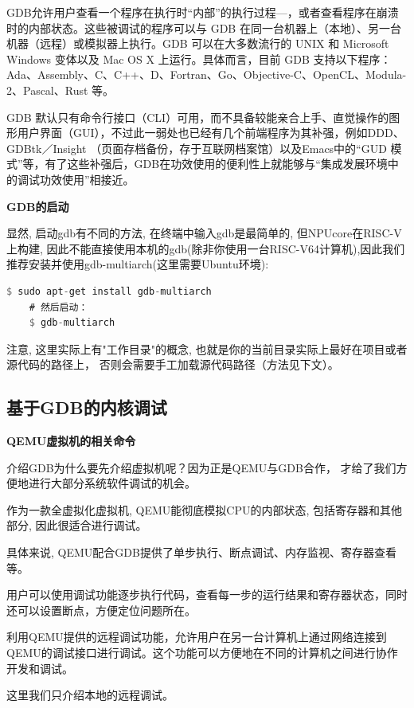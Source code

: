GDB允许用户查看一个程序在执行时“内部”的执行过程—，或者查看程序在崩溃时的内部状态。这些被调试的程序可以与 GDB 在同一台机器上（本地）、另一台机器（远程）或模拟器上执行。GDB 可以在大多数流行的 UNIX 和 Microsoft Windows 变体以及 Mac OS X 上运行。具体而言，目前 GDB 支持以下程序：Ada、Assembly、C、C++、D、Fortran、Go、Objective-C、OpenCL、Modula-2、Pascal、Rust 等。

GDB 默认只有命令行接口（CLI）可用，而不具备较能亲合上手、直觉操作的图形用户界面（GUI），不过此一弱处也已经有几个前端程序为其补强，例如DDD、GDBtk／Insight （页面存档备份，存于互联网档案馆）以及Emacs中的“GUD 模式”等，有了这些补强后，GDB在功效使用的便利性上就能够与“集成发展环境中的调试功效使用”相接近。

\textbf{GDB的启动}

显然, 启动gdb有不同的方法, 在终端中输入gdb是最简单的, 但NPUcore在RISC-V上构建, 因此不能直接使用本机的gdb(除非你使用一台RISC-V64计算机),因此我们推荐安装并使用gdb-multiarch(这里需要Ubuntu环境):
\begin{lstlisting}[language={Rust}, label={code:forktest},
	caption={forktest.rs}]
	$ sudo apt-get install gdb-multiarch
	# 然后启动：
	$ gdb-multiarch
\end{lstlisting}

注意, 这里实际上有"工作目录"的概念, 也就是你的当前目录实际上最好在项目或者源代码的路径上， 否则会需要手工加载源代码路径（方法见下文）。
\subsection{基于GDB的内核调试}
\textbf{QEMU虚拟机的相关命令}

介绍GDB为什么要先介绍虚拟机呢？因为正是QEMU与GDB合作， 才给了我们方便地进行大部分系统软件调试的机会。

作为一款全虚拟化虚拟机, QEMU能彻底模拟CPU的内部状态, 包括寄存器和其他部分, 因此很适合进行调试。

具体来说, QEMU配合GDB提供了单步执行、断点调试、内存监视、寄存器查看等。

用户可以使用调试功能逐步执行代码，查看每一步的运行结果和寄存器状态，同时还可以设置断点，方便定位问题所在。

利用QEMU提供的远程调试功能，允许用户在另一台计算机上通过网络连接到QEMU的调试接口进行调试。这个功能可以方便地在不同的计算机之间进行协作开发和调试。

这里我们只介绍本地的远程调试。

